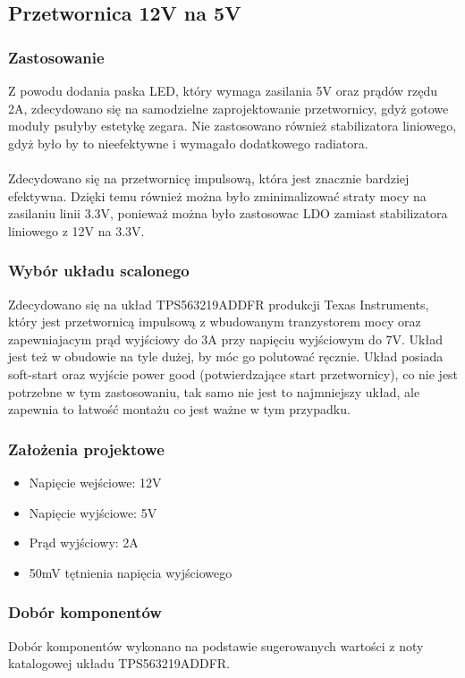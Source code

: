 \documentclass{article}
\begin{document}
\subsection{Przetwornica 12V na 5V}
\subsubsection{Zastosowanie}
Z powodu dodania paska LED, który wymaga zasilania 5V oraz prądów rzędu 2A, zdecydowano się na samodzielne zaprojektowanie przetwornicy, gdyż gotowe moduły
psułyby estetykę zegara. Nie zastosowano również stabilizatora liniowego, gdyż było by to nieefektywne i wymagało dodatkowego radiatora.
\\\\
Zdecydowano się na przetwornicę impulsową, która jest znacznie bardziej efektywna. Dzięki temu również można było zminimalizować straty mocy na zasilaniu linii 3.3V, ponieważ
można było zastosowac LDO zamiast stabilizatora liniowego z 12V na 3.3V.

\subsubsection{Wybór układu scalonego}
Zdecydowano się na układ TPS563219ADDFR produkcji Texas Instruments, który jest przetwornicą impulsową z wbudowanym tranzystorem mocy oraz zapewniajacym prąd wyjściowy do 3A przy 
napięciu wyjściowym do 7V. Układ jest też w obudowie na tyle dużej, by móc go polutować ręcznie. Układ posiada soft-start oraz wyjście power good (potwierdzające start przetwornicy), co nie jest potrzebne w tym zastosowaniu, tak samo 
nie jest to najmniejszy układ, ale zapewnia to łatwość montażu co jest ważne w tym przypadku.

\subsubsection{Założenia projektowe}
\begin{itemize}
    \item Napięcie wejściowe: 12V
    \item Napięcie wyjściowe: 5V
    \item Prąd wyjściowy: 2A
    \item 50mV tętnienia napięcia wyjściowego
\end{itemize}


\subsubsection{Dobór komponentów}
Dobór komponentów wykonano na podstawie sugerowanych wartości z noty katalogowej układu TPS563219ADDFR. 
\end{document}

